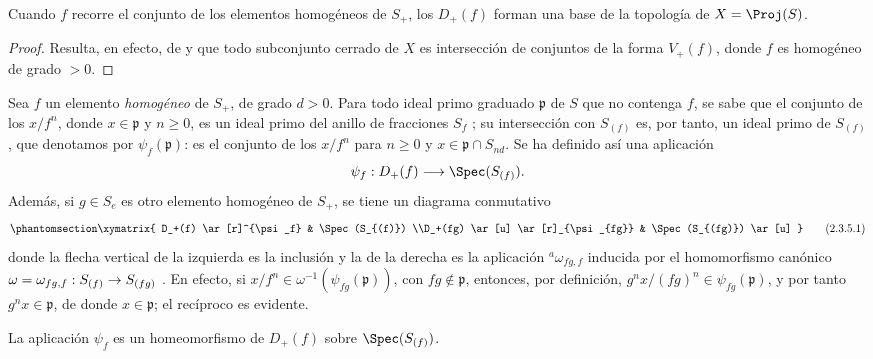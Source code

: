 \documentclass[oneside,10pt]{amsart}
\makeatletter
\renewcommand{\geq}{\geqslant}
\newcommand{\ega@arrow}[2]{\mathchoice{#1}{#2}{#2}{#2}}
\renewcommand{\to}{\ega@arrow{\longrightarrow}{\rightarrow}}
\let\EGAOriginalLabel\label
\renewcommand{\label}[1]{\phantomsection\EGAOriginalLabel{#1}}
\makeatother
\begin{document}
\begin{proposition}[2.3.4]
\label{II.2.3.4}
Cuando $f$ recorre el conjunto de los elementos homogéneos de $S_+$, los $D_+(f)$ forman una base de la topología de $X=\Proj(S)$.
\end{proposition}

\begin{proof}
Resulta, en efecto, de  y  que todo subconjunto cerrado de $X$ es intersección de conjuntos de la forma $V_+(f)$, donde $f$ es homogéneo de grado $>0$.
\end{proof}

\begin{env}[2.3.5]
\label{II.2.3.5}
Sea $f$ un elemento \emph{homogéneo} de $S_+$, de grado $d>0$.
Para todo ideal primo graduado $\mathfrak{p}$ de $S$ que no contenga $f$, se sabe que el conjunto de los $x/f^n$, donde $x\in\mathfrak{p}$ y $n\geq0$, es un ideal primo del anillo de fracciones $S_f$ ; su intersección con $S_{(f)}$ es, por tanto, un ideal primo de $S_{(f)}$, que denotamos por $\psi_f(\mathfrak{p})$: es el conjunto de los $x/f^n$ para $n\geq0$ y $x\in\mathfrak{p}\cap S_{nd}$.
Se ha definido así una aplicación
\[
  \psi_f:D_+(f)\to\Spec(S_{(f)}).
\]
Además, si $g\in S_e$ es otro elemento homogéneo de $S_+$, se tiene un diagrama conmutativo
\[
\label{II.2.3.5.1}
  \xymatrix{
    D_+(f) \ar[r]^{\psi_f}
    & \Spec(S_{(f)})
  \\D_+(fg) \ar[u] \ar[r]_{\psi_{fg}}
    & \Spec(S_{(fg)}) \ar[u]
  }
\tag{2.3.5.1}
\]
donde la flecha vertical de la izquierda es la inclusión y la de la derecha es la aplicación ${}^a\!\omega_{fg,f}$ inducida por el homomorfismo canónico $\omega=\omega_{fg,f}:S_{(f)}\to S_{(fg)}$ .
En efecto, si $x/f^n\in\omega^{-1}(\psi_{fg}(\mathfrak{p}))$, con $fg\notin\mathfrak{p}$, entonces, por definición, $g^nx/(fg)^n\in\psi_{fg}(\mathfrak{p})$, y por tanto $g^nx\in\mathfrak{p}$, de donde $x\in\mathfrak{p}$; el recíproco es evidente.
\end{env}

\begin{proposition}[2.3.6]
\label{II.2.3.6}
La aplicación $\psi_f$ es un homeomorfismo de $D_+(f)$ sobre $\Spec(S_{(f)})$.
\end{proposition}
\end{document}
